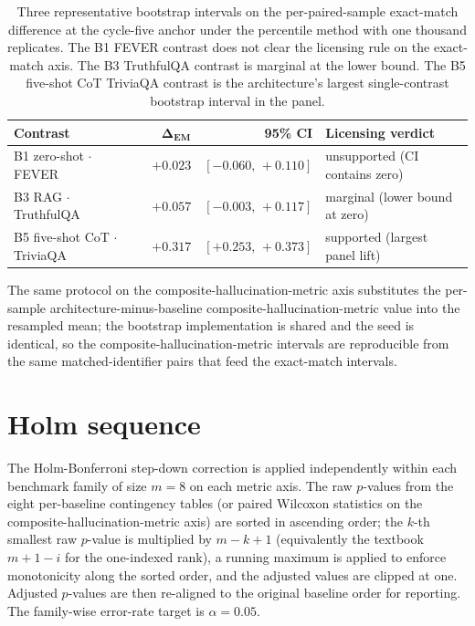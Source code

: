 \begin{table}[H]
\centering\footnotesize
\setlength{\tabcolsep}{6pt}
\renewcommand{\arraystretch}{1.1}
\begin{tabular}{@{}lrrl@{}}
\toprule
\textbf{Contrast} & $\boldsymbol{\Delta_{\text{EM}}}$ & \textbf{95\% CI} & \textbf{Licensing verdict} \\
\midrule
B1 zero-shot $\cdot$ FEVER             & $+0.023$ & $[-0.060,\, +0.110]$ & unsupported (CI contains zero) \\
B3 RAG $\cdot$ TruthfulQA              & $+0.057$ & $[-0.003,\, +0.117]$ & marginal (lower bound at zero) \\
B5 five-shot CoT $\cdot$ TriviaQA      & $+0.317$ & $[+0.253,\, +0.373]$ & supported (largest panel lift) \\
\bottomrule
\end{tabular}
\caption[Three representative bootstrap intervals on exact-match difference at the cycle-five anchor]{Three representative bootstrap intervals on the per-paired-sample exact-match difference at the cycle-five anchor under the percentile method with one thousand replicates. The B1 FEVER contrast does not clear the licensing rule on the exact-match axis. The B3 TruthfulQA contrast is marginal at the lower bound. The B5 five-shot CoT TriviaQA contrast is the architecture's largest single-contrast bootstrap interval in the panel.}
\label{tab:app-sig-boot-intervals}
\end{table}

The same protocol on the composite-hallucination-metric axis substitutes the per-sample architecture-minus-baseline composite-hallucination-metric value into the resampled mean; the bootstrap implementation is shared and the seed is identical, so the composite-hallucination-metric intervals are reproducible from the same matched-identifier pairs that feed the exact-match intervals.

\section{Holm sequence}
\label{app:sig-holm}

The Holm-Bonferroni step-down correction is applied independently within each benchmark family of size $m = 8$ on each metric axis. The raw $p$-values from the eight per-baseline contingency tables (or paired Wilcoxon statistics on the composite-hallucination-metric axis) are sorted in ascending order; the $k$-th smallest raw $p$-value is multiplied by $m - k + 1$ (equivalently the textbook $m + 1 - i$ for the one-indexed rank), a running maximum is applied to enforce monotonicity along the sorted order, and the adjusted values are clipped at one. Adjusted $p$-values are then re-aligned to the original baseline order for reporting. The family-wise error-rate target is $\alpha = 0.05$.

